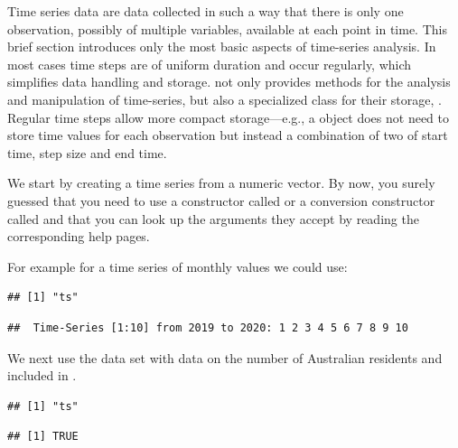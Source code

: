 \documentclass[krantz2]{krantz}\usepackage{knitr}
\begin{document}
Time series data are data collected in such a way that there is only one observation, possibly of multiple variables, available at each point in time. This brief section introduces only the most basic aspects of time-series analysis. In most cases time steps are of uniform duration and occur regularly, which simplifies data handling and storage. \Rlang not only provides methods for the analysis and manipulation of time-series, but also a specialized class for their storage, . Regular time steps allow more compact storage---e.g.,  a  object does not need to store time values for each observation but instead a combination of two of start time, step size and end time.

We start by creating a time series from a numeric vector. By now, you surely guessed that you need to use a constructor called  or a conversion constructor called  and that you can look up the arguments they accept by reading the corresponding help pages.

For example for a time series of monthly values we could use:

\begin{knitrout}\footnotesize
{}\color{fgcolor}\begin{kframe}
\begin{alltt}
 \hlkwb{<-} \hlstd{(}\hlopt{:}\hlstd{,}  \hlstd{=} \hlstd{,}  \hlstd{=} \hlopt{/}\hlstd{)}
\end{alltt}
\begin{verbatim}
## [1] "ts"
\end{verbatim}
\begin{alltt}
\end{alltt}
\begin{verbatim}
##  Time-Series [1:10] from 2019 to 2020: 1 2 3 4 5 6 7 8 9 10
\end{verbatim}
\end{kframe}
\end{knitrout}

We next use the data set  with data on the number of Australian residents and included in \Rlang.

\begin{knitrout}\footnotesize
{}\color{fgcolor}\begin{kframe}
\begin{alltt}
\end{alltt}
\begin{verbatim}
## [1] "ts"
\end{verbatim}
\begin{alltt}
\end{alltt}
\begin{verbatim}
## [1] TRUE
\end{verbatim}
\end{kframe}
\end{knitrout}
\end{document}
